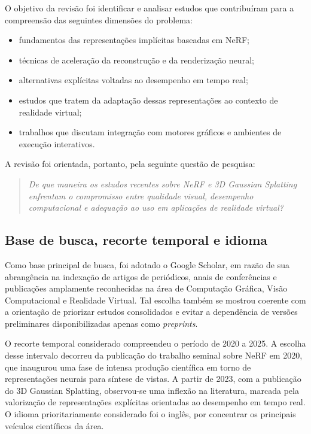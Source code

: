 O objetivo da revisão foi identificar e analisar estudos que contribuíram para a compreensão das seguintes dimensões do problema:

\begin{itemize}
    \item fundamentos das representações implícitas baseadas em NeRF;
    \item técnicas de aceleração da reconstrução e da renderização neural;
    \item alternativas explícitas voltadas ao desempenho em tempo real;
    \item estudos que tratem da adaptação dessas representações ao contexto de realidade virtual;
    \item trabalhos que discutam integração com motores gráficos e ambientes de execução interativos.
\end{itemize}

A revisão foi orientada, portanto, pela seguinte questão de pesquisa:

\begin{quote}
\textit{De que maneira os estudos recentes sobre NeRF e 3D Gaussian Splatting enfrentam o compromisso entre qualidade visual, desempenho computacional e adequação ao uso em aplicações de realidade virtual?}
\end{quote}

\subsection{Base de busca, recorte temporal e idioma}

Como base principal de busca, foi adotado o Google Scholar, em razão de sua abrangência na indexação de artigos de periódicos, anais de conferências e publicações amplamente reconhecidas na área de Computação Gráfica, Visão Computacional e Realidade Virtual. Tal escolha também se mostrou coerente com a orientação de priorizar estudos consolidados e evitar a dependência de versões preliminares disponibilizadas apenas como \textit{preprints}.

O recorte temporal considerado compreendeu o período de 2020 a 2025. A escolha desse intervalo decorreu da publicação do trabalho seminal sobre NeRF em 2020, que inaugurou uma fase de intensa produção científica em torno de representações neurais para síntese de vistas. A partir de 2023, com a publicação do 3D Gaussian Splatting, observou-se uma inflexão na literatura, marcada pela valorização de representações explícitas orientadas ao desempenho em tempo real. O idioma prioritariamente considerado foi o inglês, por concentrar os principais veículos científicos da área.


